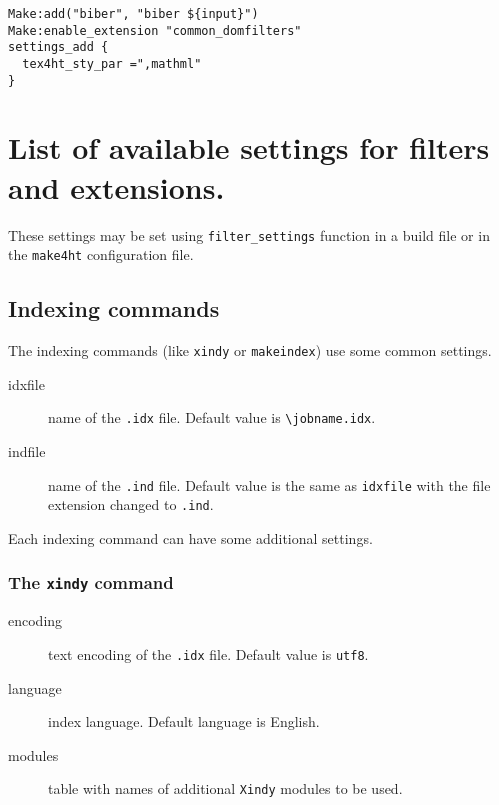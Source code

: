 \begin{verbatim}
Make:add("biber", "biber ${input}")
Make:enable_extension "common_domfilters"
settings_add {
  tex4ht_sty_par =",mathml"
}
\end{verbatim}

\hypertarget{list-of-available-settings-for-filters-and-extensions.}{%
\section{List of available settings for filters and
extensions.}\label{list-of-available-settings-for-filters-and-extensions.}}

These settings may be set using \texttt{filter\_settings} function in a
build file or in the \texttt{make4ht} configuration file.

\hypertarget{indexing-commands}{%
\subsection{Indexing commands}\label{indexing-commands}}

The indexing commands (like \texttt{xindy} or \texttt{makeindex}) use
some common settings.

\begin{description}
\item[idxfile]
name of the \texttt{.idx} file. Default value is
\texttt{\textbackslash{}jobname.idx}.
\item[indfile]
name of the \texttt{.ind} file. Default value is the same as
\texttt{idxfile} with the file extension changed to \texttt{.ind}.
\end{description}

Each indexing command can have some additional settings.

\hypertarget{the-xindy-command}{%
\subsubsection{\texorpdfstring{The \texttt{xindy}
command}{The xindy command}}\label{the-xindy-command}}

\begin{description}
\item[encoding]
text encoding of the \texttt{.idx} file. Default value is \texttt{utf8}.
\item[language]
index language. Default language is English.
\item[modules]
table with names of additional \texttt{Xindy} modules to be used.
\end{description}

